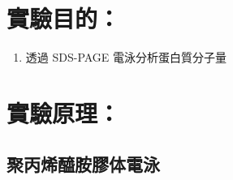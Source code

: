 \setlength{\parindent}{2em} %

\section{實驗目的：}

\begin{enumerate}[label=\arabic*.]
  \item 透過 SDS-PAGE 電泳分析蛋白質分子量
\end{enumerate}

\section{實驗原理：}

\subsection{聚丙烯醯胺膠体電泳}
